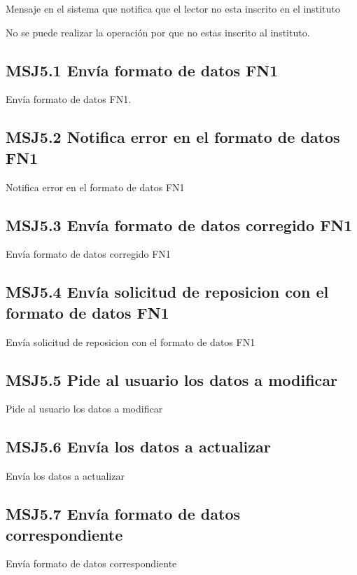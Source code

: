 Mensaje en el sistema que notifica que el lector no esta inscrito en el instituto

  \noindent No se puede realizar la operación por que no estas inscrito al instituto.

\subsection{MSJ5.1 Envía formato de datos FN1 }
  \noindent Envía formato de datos FN1.

\subsection{MSJ5.2 Notifica error en el formato de datos FN1 }
  \noindent Notifica error en el formato de datos FN1
  
 \subsection{MSJ5.3 Envía formato de datos corregido FN1 }
  \noindent Envía formato de datos corregido FN1
  
  \subsection{MSJ5.4 Envía solicitud de reposicion con el formato de datos FN1 }
  \noindent Envía solicitud de reposicion con el formato de datos FN1
  
  \subsection{MSJ5.5 Pide al usuario los datos a modificar }
  \noindent Pide al usuario los datos a modificar
  
  \subsection{MSJ5.6 Envía los datos a actualizar }
  \noindent Envía los datos a actualizar

\subsection{MSJ5.7 Envía formato de datos correspondiente }
  \noindent Envía formato de datos correspondiente
  
